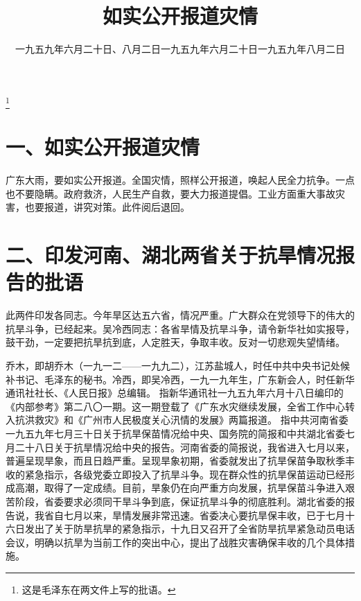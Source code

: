 
\title{如实公开报道灾情}
\date{一九五九年六月二十日、八月二日}
\thanks{这是毛泽东在两文件上写的批语。}
\maketitle


\date{一九五九年六月二十日}
\section{一、如实公开报道灾情}


广东大雨，要如实公开报道。全国灾情，照样公开报道，唤起人民全力抗争。一点也不要隐瞒。政府救济，人民生产自救，要大力报道提倡。工业方面重大事故灾害，也要报道，讲究对策。此件阅后退回。

\date{一九五九年八月二日}
\section{二、印发河南、湖北两省关于抗旱情况报告的批语}

此两件印发各同志。今年旱区达五六省，情况严重。广大群众在党领导下的伟大的抗旱斗争，已经起来。吴冷西同志：各省旱情及抗旱斗争，请令新华社如实报导，鼓干劲，一定要把抗旱抗到底，人定胜天，争取丰收。反对一切悲观失望情绪。

\begin{maonote}
乔木，即胡乔木（一九一二——一九九二），江苏盐城人，时任中共中央书记处候补书记、毛泽东的秘书。冷西，即吴冷西，一九一九年生，广东新会人，时任新华通讯社社长、《人民日报》总编辑。
指新华通讯社一九五九年六月十八日编印的《内部参考》第二八〇一期。这一期登载了《广东水灾继续发展，全省工作中心转入抗洪救灾》和《广州市人民极度关心汛情的发展》两篇报道。
指中共河南省委一九五九年七月三十日关于抗旱保苗情况给中央、国务院的简报和中共湖北省委七月二十八日关于抗旱情况给中央的报告。河南省委的简报说，我省进入七月以来，普遍呈现旱象，而且日趋严重。呈现旱象初期，省委就发出了抗旱保苗争取秋季丰收的紧急指示，各级党委立即投入了抗旱斗争。现在群众性的抗旱保苗运动已经形成高潮，取得了一定成绩。目前，旱象仍在向严重方向发展，抗旱保苗斗争进入艰苦阶段，省委要求必须同干旱斗争到底，保证抗旱斗争的彻底胜利。湖北省委的报告说，我省自七月以来，旱情发展非常迅速。省委决心要抗旱保丰收，已于七月十六日发出了关于防旱抗旱的紧急指示，十九日又召开了全省防旱抗旱紧急动员电话会议，明确以抗旱为当前工作的突出中心，提出了战胜灾害确保丰收的几个具体措施。
\end{maonote}
